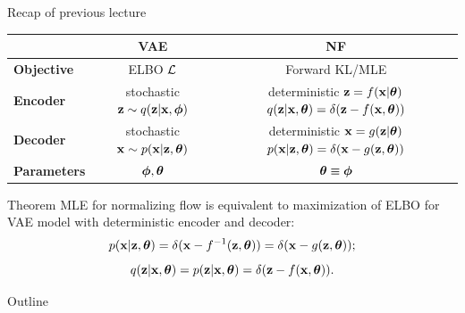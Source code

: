 \begin{frame}{Recap of previous lecture}
	\begin{table}[]
		\begin{tabular}{l|c|c}
			& \textbf{VAE} & \textbf{NF} \\ \hline
			\textbf{Objective} & ELBO $\mathcal{L}$ & Forward KL/MLE \\ \hline
			\textbf{Encoder} & \shortstack{stochastic \\ $\mathbf{z} \sim q (\mathbf{z} | \mathbf{x}, \boldsymbol{\phi})$} &  \shortstack{\\ deterministic \\ $\mathbf{z} = f(\mathbf{x} | \boldsymbol{\theta})$ \\ $q(\mathbf{z} | \mathbf{x}, \boldsymbol{\theta}) = \delta(\mathbf{z} - f(\mathbf{x}, \boldsymbol{\theta}))$}  \\ \hline
			\textbf{Decoder} & \shortstack{stochastic \\ $\mathbf{x} \sim p (\mathbf{x} | \mathbf{z}, \boldsymbol{\theta})$} & \shortstack{\\ deterministic \\ $\mathbf{x} = g(\mathbf{z} | \boldsymbol{\theta})$ \\ $ p(\mathbf{x} | \mathbf{z}, \boldsymbol{\theta}) = \delta(\mathbf{x} - g(\mathbf{z}, \boldsymbol{\theta}))$} \\ \hline
			\textbf{Parameters}  & $\boldsymbol{\phi}, \boldsymbol{\theta}$ & $\boldsymbol{\theta} \equiv \boldsymbol{\phi}$\\ 
		\end{tabular}
	\end{table}
	\begin{block}{Theorem}
		MLE for normalizing flow is equivalent to maximization of ELBO for VAE model with deterministic encoder and decoder:
		\vspace{-0.3cm}
		\[
		p(\mathbf{x} | \mathbf{z}, \boldsymbol{\theta}) = \delta (\mathbf{x} - f^{-1}(\mathbf{z}, \boldsymbol{\theta})) = \delta (\mathbf{x} - g(\mathbf{z}, \boldsymbol{\theta}));
		\]
		\[
		q(\mathbf{z} | \mathbf{x}, \boldsymbol{\theta}) = p(\mathbf{z} | \mathbf{x}, \boldsymbol{\theta}) = \delta (\mathbf{z} - f(\mathbf{x}, \boldsymbol{\theta})).
		\]
	\end{block}
\end{frame}
\begin{frame}{Outline}
	\tableofcontents
\end{frame}
